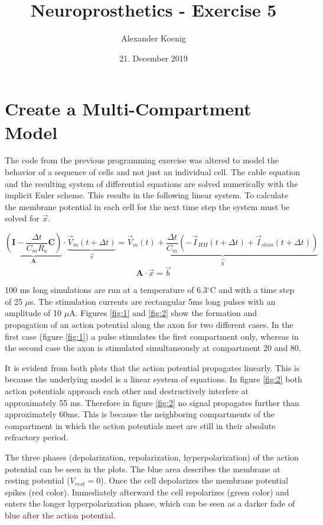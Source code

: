\documentclass{scrartcl}
\title{Neuroprosthetics - Exercise 5}
\author{Alexander Koenig}
\date{21. December 2019}
\begin{document}
\maketitle

\section{Create a Multi-Compartment Model}

The code from the previous programming exercise was altered to model the behavior of a sequence of cells and not just an individual cell. The cable equation and the resulting system of differential equations are solved numerically with the implicit Euler scheme. This results in the following linear system. To calculate the membrane potential in each cell for the next time step the system must be solved for $\vec{x}$. 

\begin{equation}
\underbrace{\left(\mathbf{I}-\frac{\Delta t}{C_{m} R_{a}} \mathbf{C}\right)}_{\mathbf{A}} \cdot \underbrace{\vec{V}_{m}(t+\Delta t)}_{\vec{x}}=\underbrace{\vec{V}_{m}(t)+\frac{\Delta t}{C_{m}}\left(-\vec{I}_{HH}(t+\Delta t)+\vec{I}_{s t i m}(t+\Delta t)\right)}_{\vec{b}}
\end{equation}
\begin{equation}
\mathbf{A} \cdot \vec{x}=\vec{b}
\end{equation}

100 ms long simulations are run at a temperature of 6.3$^\circ$C and with a time step of 25 $\mu$s. The stimulation currents are rectangular 5ms long pulses with an amplitude of 10 $\mu$A. Figures \ref{fig:1} and \ref{fig:2} show the formation and propagation of an action potential along the axon for two different cases. In the first case (figure \ref{fig:1}) a pulse stimulates the first compartment only, whereas in the second case the axon is stimulated simultaneously at compartment 20 and 80.

It is evident from both plots that the action potential propagates linearly. This is because the underlying model is a linear system of equations. In figure \ref{fig:2} both action potentials approach each other and destructively interfere at approximately 55 ms. Therefore in figure \ref{fig:2} no signal propagates further than approximately 60ms. This is because the neighboring compartments of the compartment in which the action potentials meet are still in their absolute refractory period. 

The three phases (depolarization, repolarization, hyperpolarization) of the action potential can be seen in the plots. The blue area describes the membrane at resting potential ($V_{rest} = 0$). Once the cell depolarizes the membrane potential spikes (red color). Immediately afterward the cell repolarizes (green color) and enters the longer hyperpolarization phase, which can be seen as a darker fade of blue after the action potential.
\end{document}
